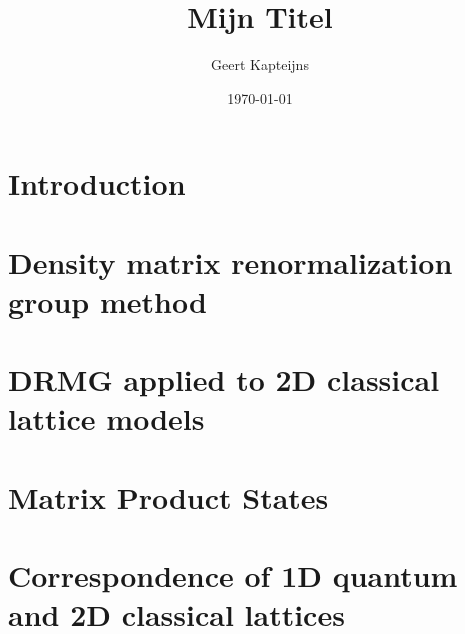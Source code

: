 \documentclass[9pt, ebook, openany, oneside]{memoir}
\begin{document}
\pagestyle{simple}



\frontmatter

\title{Mijn Titel}
\author{Geert Kapteijns}
\date{\today}


\tableofcontents

\mainmatter

\chapter{Introduction}


%

\chapter{Density matrix renormalization group method}


\chapter{DRMG applied to 2D classical lattice models}


\chapter{Matrix Product States}



\appendix
\chapter{Correspondence of 1D quantum and 2D classical lattices}



\backmatter
\printbibliography
\end{document}
